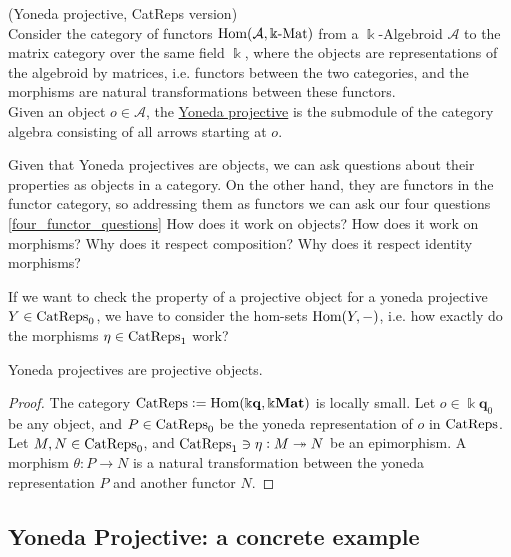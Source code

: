 \begin{definition}{(Yoneda projective, CatReps version)}\label{la:yoneda_projective}\\
Consider the category of functors $\textup{Hom}( \mathcal{A}, \Bbbk\textup{-Mat} )$ from a $\Bbbk$-Algebroid $\mathcal{A}$ to the matrix category
over the same field $\Bbbk$, where the objects are representations of the algebroid by matrices, i.e. functors between the two categories, and
the morphisms are natural transformations between these functors.\\
\noindent Given an object $o \in \mathcal{A}$, the \ul{Yoneda projective} is the submodule of the category algebra consisting of all arrows
starting at $o$.
\end{definition}

Given that Yoneda projectives are objects, we can ask questions about their properties as objects in a category. On the other hand, they are
functors in the functor category, so addressing them as functors we can ask our four questions \ref{four_functor_questions} 
How does it work on objects? How does it work on morphisms? Why does it respect composition? Why does it respect identity morphisms?

If we want to check the property of a projective object for a yoneda projective $Y \in \textup{CatReps}_{0}$, we have to consider the
hom-sets $\textup{Hom}(Y,-)$, i.e. how exactly do the morphisms $\eta \in \textup{CatReps}_{1}$ work?



\begin{lemma}
Yoneda projectives are projective objects.
\begin{proof}
The category $\textup{CatReps} := \textup{Hom}(\Bbbk \mathbf{q}, \Bbbk\mathbf{Mat})$ is locally small.
Let $o \in \Bbbk \mathbf{q}_{0}$ be any object, and $P \in \textup{CatReps}_{0}$ be the yoneda representation of $o$ in $\textup{CatReps}$.
Let $M, N \in \textup{CatReps}_{0}$, and $\textup{CatReps}_{1} \ni \eta : M \twoheadrightarrow N$ be an epimorphism.
A morphism $\theta : P \rightarrow N$ is a natural transformation between the yoneda representation $P$ and another functor $N$.
\end{proof}
\end{lemma}

\subsection{Yoneda Projective: a concrete example}

